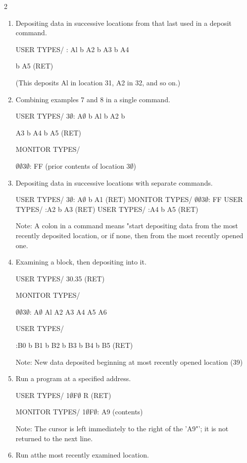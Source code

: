 \documentclass[letterpaper]{article}
\begin{document}
\begin{multicols}{2}
\begin{enumerate}
Location 39 is considered opened and now contains 39.

\item Depositing data in successive locations from that last used in a deposit command.

USER TYPES/ : Al b A2 b A3 b A4

b A5 (RET)

(This deposits Al in location 31, A2 in 32, and so on.)

\item Combining examples 7 and 8 in a single command.

USER TYPES/ 3$\emptyset$: A$\emptyset$ b Al b A2 b

A3 b A4 b A5 (RET)

MONITOR TYPES/

$\emptyset$$\emptyset$3$\emptyset$: FF (prior contents of location 3$\emptyset$)

\item Depositing data in successive locations with separate commands.

USER TYPES/ 3$\emptyset$: A$\emptyset$ b A1 (RET)
MONITOR TYPES/ $\emptyset$$\emptyset$3$\emptyset$: FF
USER TYPES/ :A2 b A3 (RET)
USER TYPES/ :A4 b A5 (RET)
\newpage

Note: A colon in a command means "start depositing data from the most recently deposited location, or if none, then from the most recently opened one.

\item Examining a block, then depositing into it. 

USER TYPES/ 30.35 (RET)

MONITOR TYPES/ 

$\emptyset$$\emptyset$3$\emptyset$: A$\emptyset$ Al A2 A3 A4 A5 A6

USER TYPES/

:B0 b B1 b B2 b B3 b B4 b B5 (RET)

Note: New data deposited beginning at most recently opened location (39)

\item Run a program at a specified address.

USER TYPES/ 1$\emptyset$F$\emptyset$ R (RET)

MONITOR TYPES/ 1$\emptyset$F$\emptyset$: A9 (contents)

Note: The cursor is left immediately to the right of the 'A9"'; it is not returned to the next line.

\item Run atthe most recently examined location.


\end{enumerate}
\end{multicols}
\end{document}
